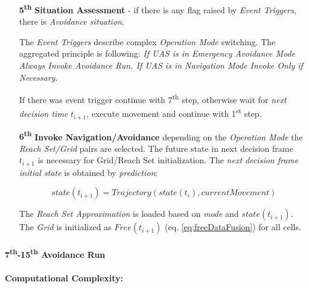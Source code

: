 \begin{itemize}
    \item[\textbf{5\textsuperscript{th}}] \textbf{Situation Assessment} - if there is any flag raised by \emph{Event Triggers}, there is \emph{Avoidance situation}.
    
    The \emph{Event Triggers} describe complex \emph{Operation Mode} switching. The aggregated principle is following: \emph{If UAS is in Emergency Avoidance Mode Always Invoke Avoidance Run. If UAS is in Navigation Mode Invoke Only if Necessary}.
    
    If there was event trigger continue with 7\textsuperscript{th} step, otherwise wait for \emph{next decision time} $t_{i+1}$, execute movement and continue with 1\textsuperscript{st} step.
    
    \item[\textbf{6\textsuperscript{th}}] \textbf{Invoke Navigation/Avoidance} depending on the \emph{Operation Mode} the \emph{Reach Set/Grid} pairs are selected. The future state in next decision frame $t_{i+1}$ is necessary for Grid/Reach Set initialization. The \emph{next decision frame initial state} is obtained by \emph{prediction}:
    
    \begin{equation*}
        state(t_{i+1}) =  Trajectory(state(t_i),current Movement)
    \end{equation*}
    
    The \emph{Reach Set Approximation} is loaded based on \emph{mode} and $state(t_{i+1})$. The \emph{Grid} is initialized as $Free(t_{i+1})$ (eq. \ref{eq:freeDataFusion}) for all cells.
\end{itemize}



\paragraph{7\textsuperscript{th}-15\textsuperscript{th} Avoidance Run}

\paragraph{Computational Complexity:}

